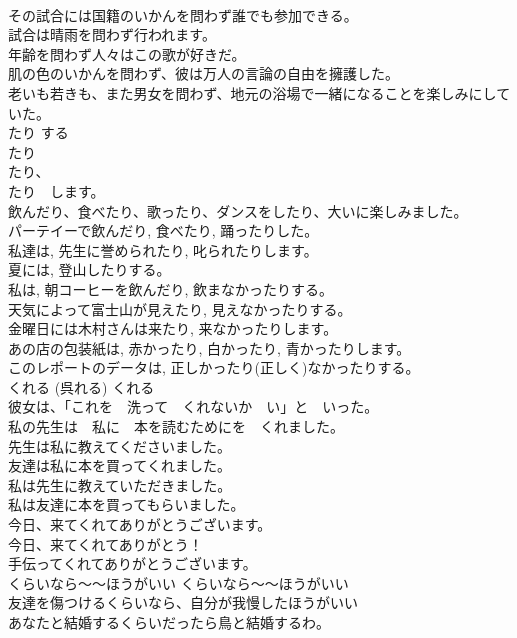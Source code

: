 \documentclass[8pt]{extreport}
\begin{document}
\begin{CJK}{UTF8}{min}
\\	その試合には国籍のいかんを問わず誰でも参加できる。  
\\	試合は晴雨を問わず行われます。  
\\	年齢を問わず人々はこの歌が好きだ。  
\\	肌の色のいかんを問わず、彼は万人の言論の自由を擁護した。  
\\	老いも若きも、また男女を問わず、地元の浴場で一緒になることを楽しみにしていた。  
\\	たり する　
\\	たり	
\\	たり、　
\\	たり　します。	
\\	飲んだり、食べたり、歌ったり、ダンスをしたり、大いに楽しみました。  
\\	パーテイーで飲んだり, 食べたり, 踊ったりした。  
\\	私達は, 先生に誉められたり, 叱られたりします。  
\\	夏には, 登山したりする。  
\\	私は, 朝コーヒーを飲んだり, 飲まなかったりする。  
\\	天気によって富士山が見えたり, 見えなかったりする。  
\\	金曜日には木村さんは来たり, 来なかったりします。  
\\	あの店の包装紙は, 赤かったり, 白かったり, 青かったりします。  
\\	このレポートのデータは, 正しかったり(正しく)なかったりする。  
\\	くれる (呉れる)	くれる	
\\	彼女は、「これを　洗って　くれないか　い」と　いった。   
\\	私の先生は　私に　本を読むためにを　くれました。　　  
\\	先生は私に教えてくださいました。   
\\	友達は私に本を買ってくれました。   
\\	私は先生に教えていただきました。 
\\	私は友達に本を買ってもらいました。 
\\	今日、来てくれてありがとうございます。   
\\	今日、来てくれてありがとう！   
\\	手伝ってくれてありがとうございます。   
\\	くらいなら〜〜ほうがいい	くらいなら〜〜ほうがいい	
\\	友達を傷つけるくらいなら、自分が我慢したほうがいい  
\\	あなたと結婚するくらいだったら鳥と結婚するわ。  

\end{CJK}
\end{document}
